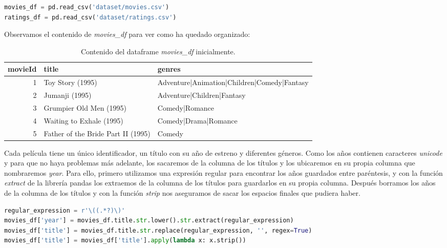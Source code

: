 \documentclass{uimppracticas}
\begin{document}
\begin{lstlisting}[language=python]
movies_df = pd.read_csv('dataset/movies.csv')
ratings_df = pd.read_csv('dataset/ratings.csv')
\end{lstlisting}

Observamos el contenido de \textit{movies\_df} para ver como ha quedado organizado:

\begin{table}[h]
	\centering
	\begin{tabular}{rll}
		\toprule
		movieId &                               title &                                       genres \\
		\midrule
		1 &                    Toy Story (1995) &  Adventure|Animation|Children|Comedy|Fantasy \\
		2 &                      Jumanji (1995) &                   Adventure|Children|Fantasy \\
		3 &             Grumpier Old Men (1995) &                               Comedy|Romance \\
		4 &            Waiting to Exhale (1995) &                         Comedy|Drama|Romance \\
		5 &  Father of the Bride Part II (1995) &                                       Comedy \\
		\bottomrule
	\end{tabular}
	\caption{Contenido del dataframe \textit{movies\_df} inicialmente.}
	\label{movies_df}
\end{table}

Cada película tiene un único identificador, un título con su año de estreno y diferentes géneros. Como los años contienen caracteres \textit{unicode} y para que no haya problemas más adelante, los sacaremos de la columna de los títulos y los ubicaremos en su propia columna que nombraremos \textit{year}. Para ello, primero utilizamos una expresión regular para encontrar los años guardados entre paréntesis, y con la función \textit{extract} de la librería pandas los extraemos de la columna de los títulos para guardarlos en su propia columna. Después borramos los años de la columna de los títulos y con la función \textit{strip} nos aseguramos de sacar los espacios finales que pudiera haber.

\begin{lstlisting}[language=python]
regular_expression = r'\((.*?)\)'
movies_df['year'] = movies_df.title.str.lower().str.extract(regular_expression)
movies_df['title'] = movies_df.title.str.replace(regular_expression, '', regex=True)
movies_df['title'] = movies_df['title'].apply(lambda x: x.strip())
\end{lstlisting}
\end{document}

